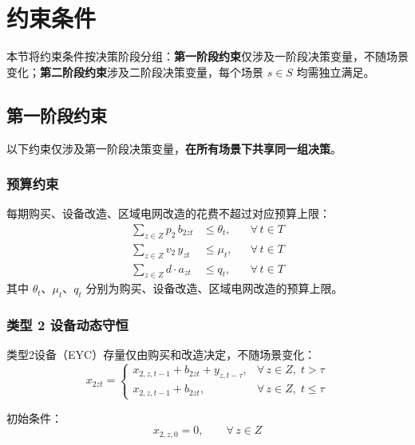 \documentclass[12pt,a4paper]{article}
\newcommand{\手批注}[2]{\textcolor{#1}{\text{\kaishu #2}}}
\newcommand{\一阶段}{\textcolor{firststage}{\text{\kaishu （一阶段）}}}
\newcommand{\二阶段}{\textcolor{secondstage}{\text{\kaishu （二阶段）}}}
\begin{document}
\section{约束条件}

本节将约束条件按决策阶段分组：\textbf{第一阶段约束}仅涉及一阶段决策变量，不随场景变化；\textbf{第二阶段约束}涉及二阶段决策变量，每个场景 $s \in S$ 均需独立满足。

\subsection{第一阶段约束}

以下约束仅涉及第一阶段决策变量，\textbf{在所有场景下共享同一组决策}。

\subsubsection{预算约束}

每期购买、设备改造、区域电网改造的花费不超过对应预算上限：
\begin{align}
    \sum_{z \in Z} p_2 \, b_{2zt} &\leq \theta_t, && \forall \, t \in T
    \label{eq:budget1-s} \\[6pt]
    \sum_{z \in Z} v_2 \, y_{zt} &\leq \mu_t, && \forall \, t \in T
    \label{eq:budget2-s} \\[6pt]
    \sum_{z \in Z} d \cdot a_{zt} &\leq q_t, && \forall \, t \in T
    \label{eq:budget3-s}
\end{align}
其中 $\theta_t$、$\mu_t$、$q_t$ 分别为购买、设备改造、区域电网改造的预算上限。

\subsubsection{类型 2 设备动态守恒}

类型2设备（EYC）存量仅由购买和改造决定，不随场景变化：
\begin{equation}
    x_{2zt} = 
    \begin{cases}
        x_{2,z,t-1} + b_{2zt} + y_{z,t-\tau}, & \forall \, z \in Z, \; t > \tau \\[6pt]
        x_{2,z,t-1} + b_{2zt}, & \forall \, z \in Z, \; t \leq \tau
    \end{cases}
    \label{eq:dyn2-s}
\end{equation}

初始条件：
\begin{equation}
    x_{2,z,0} = 0, \qquad \forall \, z \in Z
    \label{eq:dyn2_init-s}
\end{equation}
\end{document}
